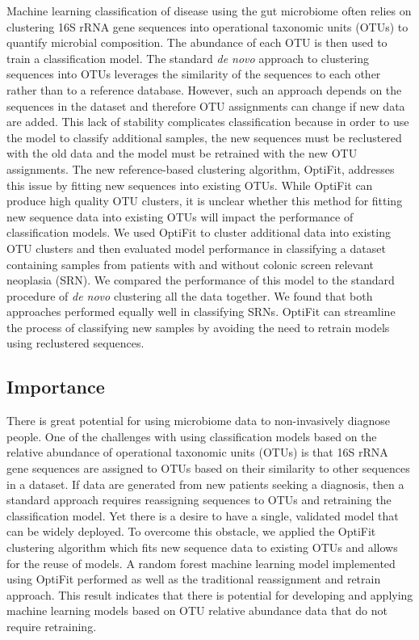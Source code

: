\documentclass[
]{article}
\begin{document}
Machine learning classification of disease using the gut microbiome
often relies on clustering 16S rRNA gene sequences into operational
taxonomic units (OTUs) to quantify microbial composition. The abundance
of each OTU is then used to train a classification model. The standard
\emph{de novo} approach to clustering sequences into OTUs leverages the
similarity of the sequences to each other rather than to a reference
database. However, such an approach depends on the sequences in the
dataset and therefore OTU assignments can change if new data are added.
This lack of stability complicates classification because in order to
use the model to classify additional samples, the new sequences must be
reclustered with the old data and the model must be retrained with the
new OTU assignments. The new reference-based clustering algorithm,
OptiFit, addresses this issue by fitting new sequences into existing
OTUs. While OptiFit can produce high quality OTU clusters, it is unclear
whether this method for fitting new sequence data into existing OTUs
will impact the performance of classification models. We used OptiFit to
cluster additional data into existing OTU clusters and then evaluated
model performance in classifying a dataset containing samples from
patients with and without colonic screen relevant neoplasia (SRN). We
compared the performance of this model to the standard procedure of
\emph{de novo} clustering all the data together. We found that both
approaches performed equally well in classifying SRNs. OptiFit can
streamline the process of classifying new samples by avoiding the need
to retrain models using reclustered sequences.

\hypertarget{importance}{%
\subsection{Importance}\label{importance}}

There is great potential for using microbiome data to non-invasively
diagnose people. One of the challenges with using classification models
based on the relative abundance of operational taxonomic units (OTUs) is
that 16S rRNA gene sequences are assigned to OTUs based on their
similarity to other sequences in a dataset. If data are generated from
new patients seeking a diagnosis, then a standard approach requires
reassigning sequences to OTUs and retraining the classification model.
Yet there is a desire to have a single, validated model that can be
widely deployed. To overcome this obstacle, we applied the OptiFit
clustering algorithm which fits new sequence data to existing OTUs and
allows for the reuse of models. A random forest machine learning model
implemented using OptiFit performed as well as the traditional
reassignment and retrain approach. This result indicates that there is
potential for developing and applying machine learning models based on
OTU relative abundance data that do not require retraining.
\end{document}
